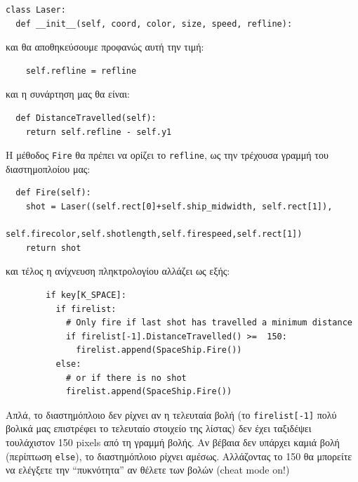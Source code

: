 \begin{verbatim}
class Laser:
  def __init__(self, coord, color, size, speed, refline):
\end{verbatim}

και θα αποθηκεύσουμε προφανώς αυτή την τιμή:

\begin{verbatim}
    self.refline = refline
\end{verbatim}

και η συνάρτηση μας θα είναι:

\begin{verbatim}
  def DistanceTravelled(self):
    return self.refline - self.y1
\end{verbatim}

Η μέθοδος {\tt Fire} θα πρέπει να ορίζει το {\tt refline}, ως την τρέχουσα γραμμή του διαστημοπλοίου μας:

\begin{verbatim}
  def Fire(self):
    shot = Laser((self.rect[0]+self.ship_midwidth, self.rect[1]),
                  self.firecolor,self.shotlength,self.firespeed,self.rect[1])
    return shot
\end{verbatim}

και τέλος η ανίχνευση πληκτρολογίου αλλάζει ως εξής:

\begin{verbatim}
        if key[K_SPACE]:
          if firelist:
            # Only fire if last shot has travelled a minimum distance
            if firelist[-1].DistanceTravelled() >=  150:
              firelist.append(SpaceShip.Fire())
          else:
            # or if there is no shot
            firelist.append(SpaceShip.Fire())
\end{verbatim}

Απλά, το διαστημόπλοιο δεν ρίχνει αν η τελευταία βολή (το {\tt firelist[-1]} πολύ βολικά μας επιστρέφει το τελευταίο στοιχείο της λίστας) δεν έχει ταξιδέψει τουλάχιστον 150 pixels από τη γραμμή βολής. Αν βέβαια δεν υπάρχει καμιά βολή (περίπτωση {\tt else}), το διαστημόπλοιο ρίχνει αμέσως. Αλλάζοντας το 150 θα μπορείτε να ελέγξετε την ``πυκνότητα'' αν θέλετε των βολών (cheat mode on!)


